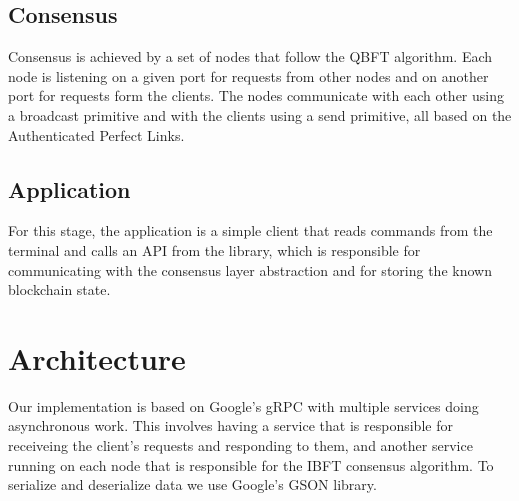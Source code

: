 \documentclass{article}
\begin{document}
\subsection{Consensus}
Consensus is achieved by a set of nodes that follow the QBFT algorithm. Each node is listening 
on a given port for requests from other nodes and on another port for requests form the clients. 
The nodes communicate with each other using a broadcast primitive and with the clients using a send 
primitive, all based on the Authenticated Perfect Links. 

\subsection{Application}
For this stage, the application is a simple client that reads commands from the terminal and calls 
an API from the library, which is responsible for communicating with the consensus layer abstraction 
and for storing the known blockchain state. 

\section{Architecture}
Our implementation is based on Google's gRPC with multiple services doing asynchronous work. This 
involves having a service that is responsible for receiveing the client's requests and responding to 
them, and another service running on each node that is responsible for the IBFT consensus algorithm.
To serialize and deserialize data we use Google's GSON library.


\newpage



% 

\end{document}
